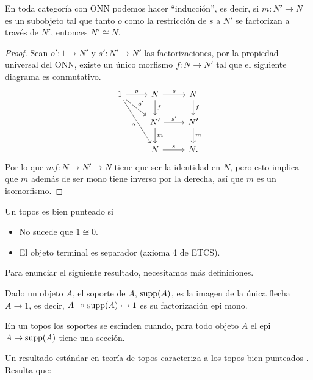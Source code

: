 \begin{proposition}
  En toda categoría con ONN podemos hacer ``inducción'', es decir, si $m\colon N'\to N$ es un subobjeto
  tal que tanto $o$ como la restricción de $s$ a $N'$ se factorizan a través de $N'$, entonces $N'\cong N$.
\end{proposition}
\begin{proof}
  Sean $o'\colon 1\to N'$ y $s'\colon N'\to N'$ las factorizaciones, por la propiedad universal del ONN, existe un único 
  morfismo $f\colon N\to N'$ tal que el siguiente diagrama es conmutativo.
  \begin{equation*}
    \begin{tikzcd}
      1\ar{r}{o}\ar{rd}{o'}\ar[swap]{rdd}{o} & N\ar{d}{f}\ar{r}{s} & N\ar{d}{f} \\
      & N'\ar{r}{s'}\ar{d}{m} & N'\ar{d}{m} \\
      & N\ar{r}{s} & N.
    \end{tikzcd}
  \end{equation*}
  Por lo que $mf\colon N\to N'\to N$ tiene que ser la identidad en $N$, pero esto implica que $m$ además de ser mono tiene
  inverso por la derecha, así que $m$ es un isomorfismo.
\end{proof}

\begin{definition}
    Un topos es bien punteado si
    \begin{itemize}
        \item No sucede que $1\cong 0$.
        \item El objeto terminal es separador (axioma 4 de ETCS).
    \end{itemize}
\end{definition}

Para enunciar el siguiente resultado, necesitamos más definiciones.

\begin{definition}
    Dado un objeto $A$, el soporte de $A$, $\operatorname{supp}(A)$, es la imagen de la única flecha $A\to 1$, es decir,
    $A\twoheadrightarrow \operatorname{supp}(A)\rightarrowtail 1$ es su factorización epi mono.
\end{definition}

\begin{definition}
    En un topos los soportes se escinden cuando, para todo objeto $A$ el epi $A\to\operatorname{supp}(A)$ tiene una sección.
\end{definition}

Un resultado estándar en teoría de topos caracteriza a los topos bien punteados \cite{maclane2012sheaves}. Resulta que:

